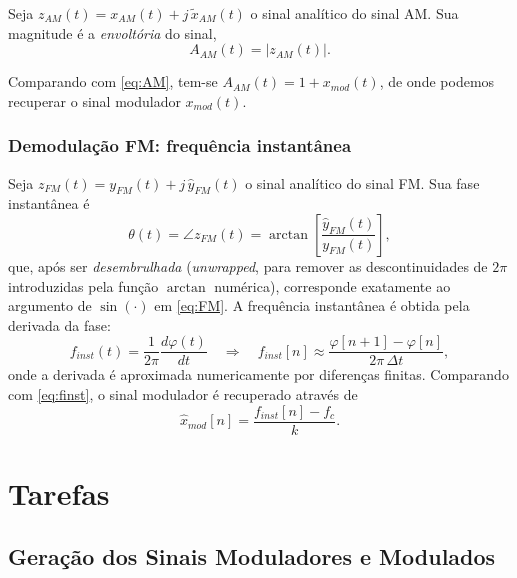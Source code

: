 \documentclass[a4paper,twoside,12pt]{article}
\begin{document}
	Seja $z_{AM}(t) = x_{AM}(t) + j\, \tilde{x}_{AM}(t)$ o sinal analítico do sinal AM. Sua magnitude é a \emph{envoltória} do sinal,
	\begin{equation}
		A_{AM}(t) = \left| z_{AM}(t) \right|.
	\end{equation}
	
	Comparando com \eqref{eq:AM}, tem-se $A_{AM}(t) = 1 + x_{mod}(t)$, de onde podemos recuperar o sinal modulador $x_{mod}(t)$.
	
	\subsubsection{Demodulação FM: frequência instantânea}
	
	Seja $z_{FM}(t) = y_{FM}(t) + j\, \hat{y}_{FM}(t)$ o sinal analítico do sinal FM. Sua fase instantânea é
	\begin{equation}
		\theta(t) = \angle z_{FM}(t) = \arctan\left[\frac{\hat{y}_{FM}(t)}{y_{FM}(t)}\right],
	\end{equation}
	que, após ser \emph{desembrulhada} (\emph{unwrapped}, para remover as descontinuidades de $2\pi$ introduzidas pela função $\arctan$ numérica), corresponde exatamente ao argumento de $\sin(\cdot)$ em \eqref{eq:FM}. A frequência instantânea é obtida pela derivada da fase:
	\begin{equation}
		f_{inst}(t) = \frac{1}{2\pi} \frac{d\varphi(t)}{dt} \quad \Longrightarrow \quad f_{inst}[n] \approx \frac{\varphi[n+1] - \varphi[n]}{2\pi\, \Delta t},
	\end{equation}
	onde a derivada é aproximada numericamente por diferenças finitas. Comparando com \eqref{eq:finst}, o sinal modulador é recuperado através de
	\begin{equation}
		\hat{x}_{mod}[n] = \frac{f_{inst}[n] - f_c}{k}.
	\end{equation}
	
	
	\section{Tarefas}
	\label{sec:tarefas}
	
	\subsection{Geração dos Sinais Moduladores e Modulados}
	\label{sec:tarefas1}
	
\end{document}
